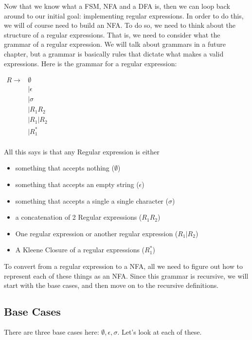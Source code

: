 \documentclass[main.tex]{subfiles}
\begin{document}
Now that we know what a FSM, NFA and a DFA is, then we can loop back around to our initial goal: implementing regular expressions. In order to do this, we will of course need to build an NFA. To do so, we need to think about the structure of a regular expressions. That is, we need to consider what the grammar of a regular expression. We will talk about grammars in a future chapter, but a grammar is basically rules that dictate what makes a valid expressions. Here is the grammar for a regular expression:
\begin{center}
    $\begin{array}{rl}
         R \rightarrow & \emptyset \\
         & \vert \epsilon \\
         & \vert \sigma \\
         & \vert R_1R_2 \\
         & \vert R_1\vert R_2\\
         & \vert R_1^*\\
    \end{array}$
\end{center}
All this says is that any Regular expression is either
\begin{itemize}
    \item something that accepts nothing ($\emptyset$)
    \item something that accepts an empty string ($\epsilon$)
    \item something that accepts a single a single character ($\sigma$)
    \item a concatenation of 2 Regular expressions ($R_1R_2$)
    \item One regular expression or another regular expression ($R_1\vert R_2$)
    \item A Kleene Closure of a regular expressions ($R_1^*$)
\end{itemize}

To convert from a regular expression to a NFA, all we need to figure out how to represent each of these things as an NFA. Since this grammar is recursive, we will start with the base cases, and then move on to the recursive definitions. 

\subsection{Base Cases}

There are three base cases here: $\emptyset, \epsilon, \sigma$. Let's look at each of these. 
\end{document}
